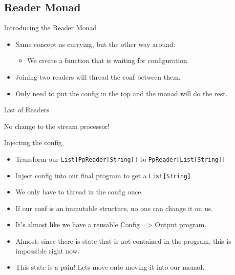\documentclass[professionalFonts,aspectratio=169]{beamer}
\begin{document}
\subsection{Reader Monad}

\begin{frame}{Introducing the Reader Monad}
\begin{itemize}
\pause \item Same concept as currying, but the other way around:
  \begin{itemize}
    \pause \item We create a function that is waiting for configuration.
  \end{itemize}
\pause \item Joining two readers will thread the conf between them.
\pause \item Only need to put the config in the top and the monad will do the rest.
\end{itemize}



\end{frame}

\begin{frame}{List of Readers}

No change to the stream processor!



\end{frame}

\begin{frame}{Injecting the config}



\begin{itemize}
\pause \item Transform our \texttt{List[PpReader[String]]} to \texttt{PpReader[List[String]]}
\pause \item Inject config into our final program to get a \texttt{List[String]}
\pause \item We only have to thread in the config once.
\pause \item If our conf is an immutable structure, no one can change it on us.
\pause \item It's almost like we have a reusable Config => Output program.
\pause \item Almost: since there is state that is not contained in the program, this is impossible right now.
\pause \item This state is a pain! Lets move onto moving it into our monad.
\end{itemize}

\end{frame}
\end{document}
